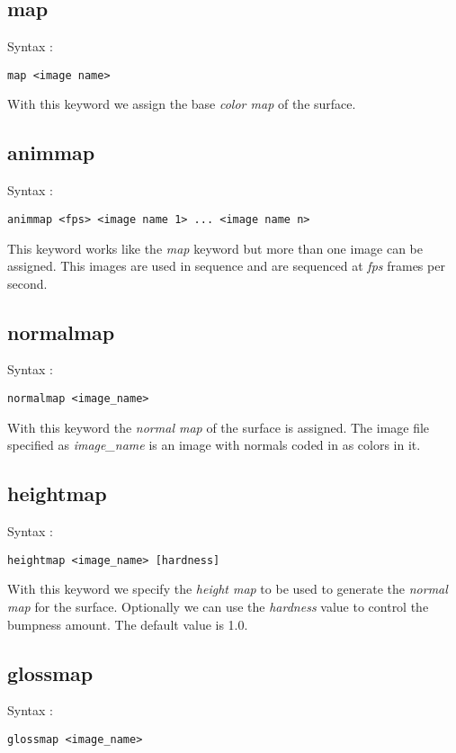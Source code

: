 \documentclass[12pt, titlepage]{amsart}
\begin{document}
\subsection{map}
Syntax :
\begin{verbatim}
map <image name>
\end{verbatim}

With this keyword we assign the base \textit{color map} of the surface.

\subsection{animmap}
Syntax :
\begin{verbatim}
animmap <fps> <image name 1> ... <image name n>
\end{verbatim}

This keyword works like the \textit{map} keyword but more than one
image can be assigned. This images are used in sequence and are
sequenced at \textit{fps} frames per second.

\subsection{normalmap}
Syntax :
\begin{verbatim}
normalmap <image_name>
\end{verbatim}

With this keyword the \textit{normal map} of the surface is assigned.
The image file specified as \textit{image\_name} is an image with normals
coded in as colors in it.

\subsection{heightmap}
Syntax :
\begin{verbatim}
heightmap <image_name> [hardness]
\end{verbatim}

With this keyword we specify the \textit{height map} to be used to
generate the \textit{normal map} for the surface. Optionally we can
use the \textit{hardness} value to control the bumpness amount. The
default value is 1.0.

\subsection{glossmap}
Syntax :
\begin{verbatim}
glossmap <image_name>
\end{verbatim}
\end{document}
